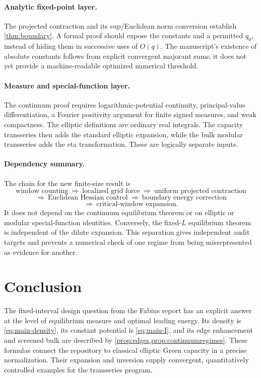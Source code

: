 \documentclass[11pt,a4paper]{article}
\theoremstyle{definition}
\theoremstyle{remark}
\begin{document}
\paragraph{Analytic fixed-point layer.}
The projected contraction and its sup/Euclidean norm conversion establish
\cref{thm:boundary}. A formal proof should expose the constants and a
permitted $q_0$, instead of hiding them in successive uses of $O(q)$.
The manuscript's existence of absolute constants follows from explicit
convergent majorant sums; it does not yet provide a machine-readable
optimized numerical threshold.

\paragraph{Measure and special-function layer.}
The continuum proof requires logarithmic-potential continuity,
principal-value differentiation, a Fourier positivity argument for finite
signed measures, and weak compactness. The elliptic definitions are
ordinary real integrals. The capacity transseries then adds the standard
elliptic expansion, while the bulk modular transseries adds the eta
transformation. These are logically separate inputs.

\paragraph{Dependency summary.}
The chain for the new finite-size result is
\[
 \text{window counting}\ \Longrightarrow\
 \text{localized grid force}\ \Longrightarrow\
 \text{uniform projected contraction}
\]
\[
 \Longrightarrow\ \text{Euclidean Hessian control}\
 \Longrightarrow\ \text{boundary energy correction}
\]
\[
 \Longrightarrow\ \text{critical-window expansion}.
\]
It does not depend on the continuum equilibrium theorem or on elliptic
or modular special-function identities. Conversely, the fixed-$L$
equilibrium theorem is independent of the dilute expansion. This
separation gives independent audit targets and prevents a numerical
check of one regime from being misrepresented as evidence for another.

\section{Conclusion}
The fixed-interval design question from the Fabius report has an explicit
answer at the level of equilibrium measure and optimal leading energy.
Its density is \eqref{eq:main-density}, its constant potential is
\eqref{eq:main-I}, and its edge enhancement and screened bulk are described
by \cref{prop:edges,prop:continuumregimes}. These formulas connect the
repository to classical elliptic Green capacity in a precise normalization.
Their expansion and inversion supply convergent, quantitatively controlled
examples for the transseries program.
\end{document}
